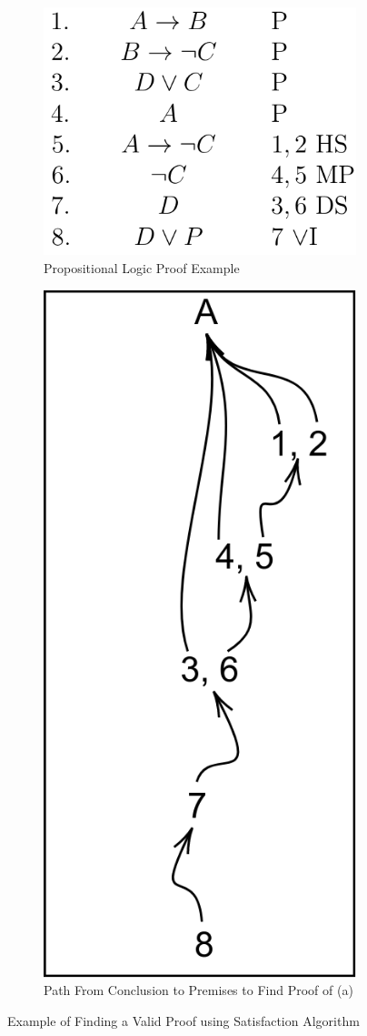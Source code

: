 \documentclass[ms]{uncgdissertationexp2}
\theoremstyle{plain}
\theoremstyle{definition}
\theoremstyle{remark}
\begin{document}
\begin{figure}[!ht]
	\centering
	\begin{subfigure}{.5\textwidth}
		\centering
		\includegraphics[width=.9\textwidth]{algorithmexample.png}
		\caption{Propositional Logic Proof Example}
		\label{fig:algorithmexample}
	\end{subfigure}%
	\begin{subfigure}{.5\textwidth}
		\centering
		\includegraphics[width=.35\textwidth]{algorithmpath.png}
		\caption{Path From Conclusion to Premises to Find Proof of (a)}
		\label{fig:algorithmpath}
	\end{subfigure}
	\caption{Example of Finding a Valid Proof using Satisfaction Algorithm}
	\label{fig:togetheralgorithm}
\end{figure}
\end{document}
